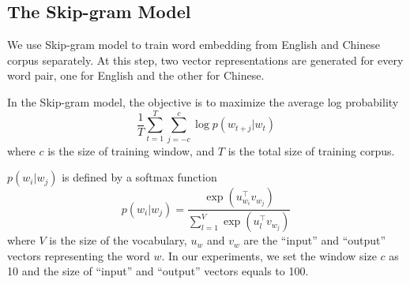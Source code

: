 %
%
%


\subsection{The Skip-gram Model}

We use Skip-gram model to train word embedding from English and Chinese
corpus separately. At this step, two vector representations are generated
for every word pair, one for English and the other for Chinese.

In the Skip-gram model, the objective is to maximize the average
log probability
\begin{equation*}
\frac{1}{T} \sum_{t=1}^{T} \sum_{j=-c}^{c} \log p(w_{t+j}|w_t)
\end{equation*}
where $c$ is the size of training window,
and $T$ is the total size of training corpus.

$p(w_i|w_j)$ is defined by a softmax function
\begin{equation*}
p(w_i|w_j)=\frac{\exp(u_{w_i}^{\top} v_{w_j})}{\sum_{l = 1}^{V} \exp(u_l^{\top} v_{w_j})}
\end{equation*}
where $V$ is the size of the vocabulary, $u_w$ and $v_w$ are the ``input'' and ``output'' vectors representing the word $w$. In our experiments, we set the window size $c$ as 10 and the size of ``input'' and ``output'' vectors equals to 100.

